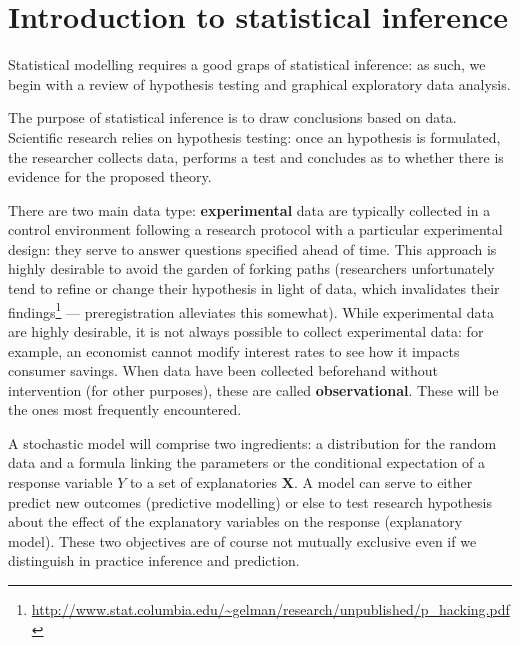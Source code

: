 \documentclass[
  11pt,
  letterpaper,
]{book}
\renewcommand{\href}[2]{#2\footnote{\url{#1}}}
\theoremstyle{definition}
\theoremstyle{definition}
\theoremstyle{definition}
\theoremstyle{remark}
\begin{document}
\newcommand{\bs}[1]{\boldsymbol{#1}}
\newcommand{\Hmat}{\mathbf{H}}
\newcommand{\Mmat}{\mathbf{M}}
\newcommand{\mX}{\mathbf{X}}
\newcommand{\bX}{{\mathbf{X}}}
\newcommand{\bx}{{\mathbf{x}}}
\newcommand{\by}{{\boldsymbol{y}}}
\newcommand{\bY}{{\boldsymbol{Y}}}
\newcommand{\eps}{\varepsilon}
\newcommand{\beps}{\boldsymbol{\varepsilon}}
\newcommand{\bbeta}{\boldsymbol{\beta}}
\newcommand{\hbb}{\hat{\boldsymbol{\beta}}}
\newcommand{\limni}{\lim_{n \ra \infty}}
\newcommand{\Sp}{\mathscr{S}}
\newcommand{\Hy}{\mathscr{H}}
\newcommand{\E}[2][]{{\mathsf E}_{#1}\left(#2\right)}
\newcommand{\Va}[2][]{{\mathsf{Var}_{#1}}\left(#2\right)}
\newcommand{\I}[1]{{\mathbf 1}_{#1}}

\hypertarget{intro}{%
\chapter{Introduction to statistical inference}\label{intro}}

Statistical modelling requires a good graps of statistical inference: as such, we begin with a review of hypothesis testing and graphical exploratory data analysis.

The purpose of statistical inference is to draw conclusions based on data. Scientific research relies on hypothesis testing: once an hypothesis is formulated, the researcher collects data, performs a test and concludes as to whether there is evidence for the proposed theory.

There are two main data type: \textbf{experimental} data are typically collected in a control environment following a research protocol with a particular experimental design: they serve to answer questions specified ahead of time. This approach is highly desirable to avoid the garden of forking paths \href{http://www.stat.columbia.edu/~gelman/research/unpublished/p_hacking.pdf}{(researchers unfortunately tend to refine or change their hypothesis in light of data, which invalidates their findings} --- preregistration alleviates this somewhat). While experimental data are highly desirable, it is not always possible to collect experimental data: for example, an economist cannot modify interest rates to see how it impacts consumer savings. When data have been collected beforehand without intervention (for other purposes), these are called \textbf{observational}. These will be the ones most frequently encountered.

A stochastic model will comprise two ingredients: a distribution for the random data and a formula linking the parameters or the conditional expectation of a response variable \(Y\) to a set of explanatories \(\mathbf{X}\). A model can serve to either predict new outcomes (predictive modelling) or else to test research hypothesis about the effect of the explanatory variables on the response (explanatory model). These two objectives are of course not mutually exclusive even if we distinguish in practice inference and prediction.
\end{document}
